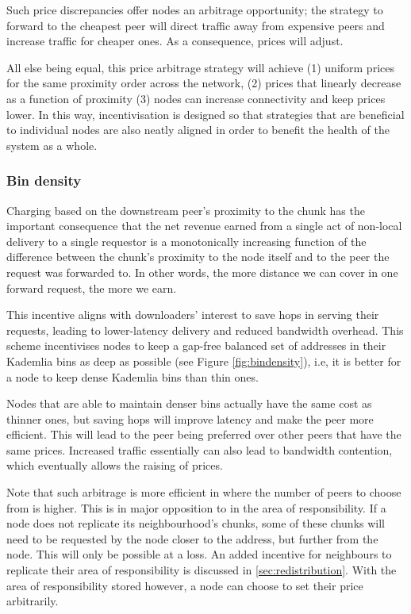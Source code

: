 Such price discrepancies offer nodes an arbitrage opportunity; the strategy to forward to the cheapest peer will direct traffic away from expensive peers and increase traffic for cheaper ones. As a consequence, prices will adjust. 

All else being equal, this price arbitrage strategy will achieve (1) uniform prices for the same proximity order across the network, (2) prices that linearly decrease as a function of proximity (3) nodes can increase connectivity and keep prices lower. In this way, incentivisation is designed so that strategies that are beneficial to individual nodes are also neatly aligned in order to benefit the health of the system as a whole.


\subsubsection{Bin density}

Charging based on the downstream peer's proximity to the chunk has the important consequence that the net revenue earned from a single act of non-local delivery to a single requestor is a monotonically increasing function of the difference between the chunk's proximity to the node itself and to the peer the request was forwarded to. In other words, the more distance we can cover in one forward request, the more we earn. 

This incentive aligns with downloaders' interest to save hops in serving their requests, leading to lower-latency delivery and reduced bandwidth overhead. This scheme incentivises nodes to keep a gap-free balanced set of addresses in their Kademlia bins as deep as possible (see Figure \ref{fig:bindensity}), i.e, it is better for a node to keep dense Kademlia bins than thin ones.


Nodes that are able to maintain denser bins actually have the same cost as thinner ones, but saving hops will improve latency and make the peer more efficient. This will lead to the peer being preferred over other peers that have the same prices. Increased traffic essentially can also lead to bandwidth contention, which eventually allows the raising of prices. 

Note that such arbitrage is more efficient in  where the number of peers to choose from is higher. This is in major opposition to  in the area of responsibility. If a node does not replicate its neighbourhood's chunks, some of these chunks will need to be requested by the node closer to the address, but further from the node. This will only be possible at a loss. An added incentive for neighbours to replicate their area of responsibility is discussed in \ref{sec:redistribution}. With the area of responsibility stored however, a node can choose to set their price arbitrarily. 


